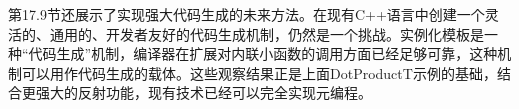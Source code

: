 第17.9节还展示了实现强大代码生成的未来方法。在现有C++语言中创建一个灵活的、通用的、开发者友好的代码生成机制，仍然是一个挑战。实例化模板是一种“代码生成”机制，编译器在扩展对内联小函数的调用方面已经足够可靠，这种机制可以用作代码生成的载体。这些观察结果正是上面DotProductT示例的基础，结合更强大的反射功能，现有技术已经可以完全实现元编程。











































